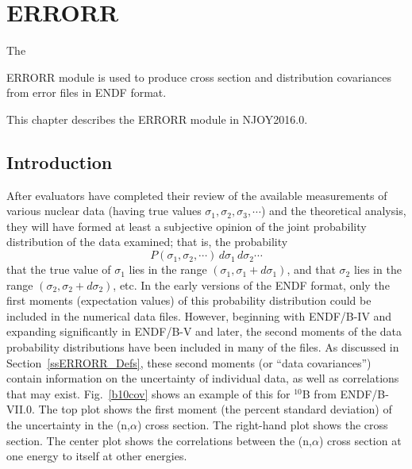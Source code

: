 \section{ERRORR}
\label{sERRORR}

\hypertarget{sERRORRhy}{The}
ERRORR module is used to produce cross section and distribution
covariances from error files in ENDF format.

This chapter describes the ERRORR module in NJOY2016.0.

\subsection{Introduction}
\label{ssERRORR_Intro}

After evaluators have completed their review of the available
measurements of various nuclear data (having true values $\sigma_{1},
\sigma_{2}, \sigma_{3},\cdots$) and the theoretical analysis, they will
have formed at least a subjective opinion of the joint probability
distribution of the data examined; that is, the probability
\[ P(\sigma_{1},\sigma_{2},\cdots) \, d\sigma_{1}\, d\sigma_{2}\cdots\]
that the true value of $\sigma_1$ lies in the range $(\sigma_1,
\sigma_1 {+} d\sigma_1)$, and that $\sigma_2$ lies in the range
$(\sigma_2, \sigma_2 {+} d\sigma_2)$, etc.  In the early versions
of the ENDF format, only the first moments (expectation values) of this
probability distribution could be included in the numerical data
files.  However, beginning with ENDF/B-IV and expanding significantly
in ENDF/B-V and later, the second moments of the data
probability distributions have been included in many of the files.
As discussed in Section~\ref{ssERRORR_Defs}, these second moments
(or ``data covariances'')
contain information on the uncertainty of individual data, as well as
correlations that may exist.  Fig.~\ref{b10cov} shows an example of
this for $^{10}$B from ENDF/B-VII.0.  The top plot shows the first
moment (the percent standard deviation) of the uncertainty in the
(n,$\alpha$) cross section.  The right-hand plot shows the cross
section.  The center plot shows the correlations between the
(n,$\alpha$) cross section at one energy to itself at other energies.

